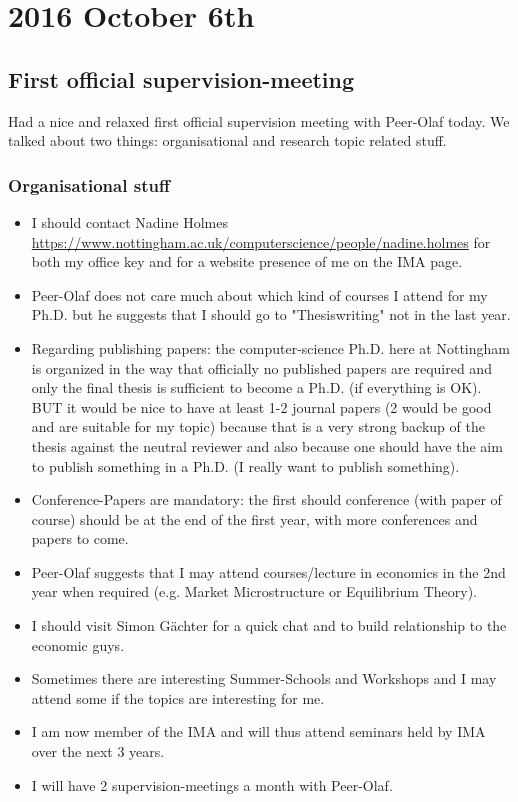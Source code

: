 \section*{2016 October 6th}

\subsection*{First official supervision-meeting}
Had a nice and relaxed first official supervision meeting with Peer-Olaf today. We talked about two things: organisational and research topic related stuff.

\subsubsection*{Organisational stuff}

\begin{itemize}
\item I should contact Nadine Holmes \url{https://www.nottingham.ac.uk/computerscience/people/nadine.holmes} for both my office key and for a website presence of me on the IMA page.
\item Peer-Olaf does not care much about which kind of courses I attend for my Ph.D. but he suggests that I should go to "Thesiswriting" not in the last year.
\item Regarding publishing papers: the computer-science Ph.D. here at Nottingham is organized in the way that officially no published papers are required and only the final thesis is sufficient to become a Ph.D. (if everything is OK). BUT it would be nice to have at least 1-2 journal papers (2 would be good and are suitable for my topic) because that is a very strong backup of the thesis against the neutral reviewer and also because one should have the aim to publish something in a Ph.D. (I really want to publish something).
\item Conference-Papers are mandatory: the first should conference (with paper of course) should be at the end of the first year, with more conferences and papers to come.
\item Peer-Olaf suggests that I may attend courses/lecture in economics in the 2nd year when required (e.g. Market Microstructure or Equilibrium Theory).
\item I should visit Simon Gächter for a quick chat and to build relationship to the economic guys.
\item Sometimes there are interesting Summer-Schools and Workshops and I may attend some if the topics are interesting for me.
\item I am now member of the IMA and will thus attend seminars held by IMA over the next 3 years.
\item I will have 2 supervision-meetings a month with Peer-Olaf.
\end{itemize}

